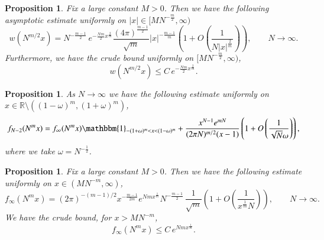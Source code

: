 \documentclass[11pt,reqno]{amsproc}
\newtheorem{proposition}[theorem]{Proposition}
\numberwithin{equation}{section}
\numberwithin{theorem}{section}
\begin{document}
\begin{proposition}
\label{prop:gin1}
Fix a large constant $M>0$. Then we have the following asymptotic estimate uniformly on $|x| \in [MN^{-\frac{m}{2}},\infty)$
\begin{equation}
w(N^{m/2}x) = N^{-\frac{m-1}{2}}\,e^{-\frac{Nm}{2}x^{\frac{2}{m}}}\frac{(4\pi)^{\frac{m-1}{2}}}{\sqrt{m}}|x|^{-\frac{m-1}{m}}\left(1+O\left(\frac{1}{N|x|^{\frac{2}{m}}}\right)\right), \qquad N \to \infty. \label{wresult}
\end{equation}
Furthermore, we have the crude bound uniformly on $[MN^{-\frac{m}{2}},\infty)$,
\begin{equation}
\label{crudegin}
w(N^{m/2}x) \leq C\,e^{-\frac{Nm}{2}x^{\frac{2}{m}}}.
\end{equation}
\end{proposition}
\begin{proposition}
\label{prop:gin2}
As $N \to \infty$ we have the following estimate uniformly on $x \in \mathbb{R}\setminus((1-\omega)^{m},(1+\omega)^{m})$,
\begin{equation}
f_{N-2}(N^{m}x) = f_{\infty}(N^{m}x)\mathbbm{1}_{-(1+\omega)^{m} < x < (1-\omega)^{m}} + \frac{x^{N-1}e^{mN}}{(2\pi N)^{m/2}(x-1)}\left(1+O\left(\frac{1}{\sqrt{N}\omega}\right)\right), \label{fintest}
\end{equation}
where we take $\omega = N^{-\frac{1}{2}}$.
\end{proposition}

\begin{proposition}
\label{prop:gin3}
Fix a large constant $M>0$. Then we have the following estimate uniformly on $x \in (MN^{-m},\infty)$,
\begin{equation}
f_{\infty}(N^{m}x) = (2\pi)^{-(m-1)/2}x^{-\frac{m-1}{2m}}e^{Nmx^{\frac{1}{m}}}N^{-\frac{m-1}{2}}\,\frac{1}{\sqrt{m}}\left(1+O\left(\frac{1}{x^{\frac{1}{m}}N}\right)\right), \qquad N \to \infty. \label{asyfint}
\end{equation}
We have the crude bound, for $x > MN^{-m}$, 
\begin{equation}
f_{\infty}(N^{m}x) \leq C\,e^{Nmx^{\frac{1}{m}}}. \label{crudefn}
\end{equation}
\end{proposition}
\end{document}
